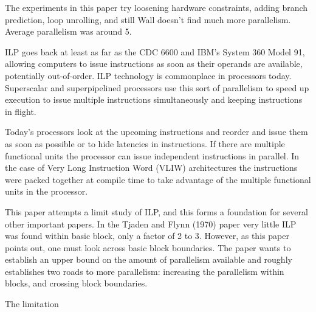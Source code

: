 \documentclass[12pt,twoside,letterpaper]{article}
\begin{document}
The experiments in this paper try loosening hardware constraints, adding branch prediction, loop unrolling, and still Wall doesn’t find much more parallelism. Average parallelism was around 5.








ILP goes back at least as far as the CDC 6600 and IBM’s System 360 Model 91, allowing computers to issue instructions as soon as their operands are available, potentially out-of-order. ILP technology is commonplace in processors today. Superscalar and superpipelined processors use this sort of parallelism to speed up execution to issue multiple instructions simultaneously and keeping instructions in flight.

Today’s processors look at the upcoming instructions and reorder and issue them as soon as possible or to hide latencies in instructions. If there are multiple functional units the processor can issue independent instructions in parallel. In the case of Very Long Instruction Word (VLIW) architectures the instructions were packed together at compile time to take advantage of the multiple functional units in the processor.

This paper attempts a limit study of ILP, and this forms a foundation for several other important papers. In the Tjaden and Flynn (1970) paper very little ILP was found within basic block, only a factor of 2 to 3. However, as this paper points out, one must look across basic block boundaries. The paper wants to establish an upper bound on the amount of parallelism available and roughly establishes two roads to more parallelism: increasing the parallelism within blocks, and crossing block boundaries.

The limitation 


\end{document}
